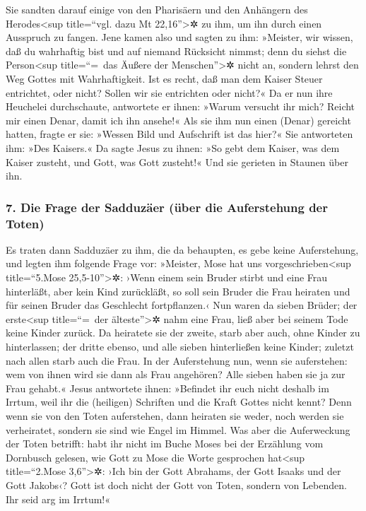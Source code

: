  Sie sandten darauf einige von den Pharisäern und den
Anhängern des Herodes\textless sup title=``vgl. dazu Mt
22,16''\textgreater✲ zu ihm, um ihn durch einen Ausspruch zu fangen.
 Jene kamen also und sagten zu ihm: »Meister, wir wissen,
daß du wahrhaftig bist und auf niemand Rücksicht nimmst; denn du siehst
die Person\textless sup title=``=~das Äußere der Menschen''\textgreater✲
nicht an, sondern lehrst den Weg Gottes mit Wahrhaftigkeit. Ist es
recht, daß man dem Kaiser Steuer entrichtet, oder nicht? Sollen wir sie
entrichten oder nicht?«  Da er nun ihre Heuchelei
durchschaute, antwortete er ihnen: »Warum versucht ihr mich? Reicht mir
einen Denar, damit ich ihn ansehe!«  Als sie ihm nun
einen (Denar) gereicht hatten, fragte er sie: »Wessen Bild und
Aufschrift ist das hier?« Sie antworteten ihm: »Des Kaisers.«
 Da sagte Jesus zu ihnen: »So gebt dem Kaiser, was dem
Kaiser zusteht, und Gott, was Gott zusteht!« Und sie gerieten in Staunen
über ihn.

\hypertarget{die-frage-der-sadduzuxe4er-uxfcber-die-auferstehung-der-toten}{%
\subsubsection{7. Die Frage der Sadduzäer (über die Auferstehung der
Toten)}\label{die-frage-der-sadduzuxe4er-uxfcber-die-auferstehung-der-toten}}

 Es traten dann Sadduzäer zu ihm, die da behaupten, es
gebe keine Auferstehung, und legten ihm folgende Frage vor:
 »Meister, Mose hat uns vorgeschrieben\textless sup
title=``5.Mose 25,5-10''\textgreater✲: ›Wenn einem sein Bruder stirbt
und eine Frau hinterläßt, aber kein Kind zurückläßt, so soll sein Bruder
die Frau heiraten und für seinen Bruder das Geschlecht fortpflanzen.‹
 Nun waren da sieben Brüder; der erste\textless sup
title=``=~der älteste''\textgreater✲ nahm eine Frau, ließ aber bei
seinem Tode keine Kinder zurück.  Da heiratete sie der
zweite, starb aber auch, ohne Kinder zu hinterlassen; der dritte ebenso,
 und alle sieben hinterließen keine Kinder; zuletzt nach
allen starb auch die Frau.  In der Auferstehung nun, wenn
sie auferstehen: wem von ihnen wird sie dann als Frau angehören? Alle
sieben haben sie ja zur Frau gehabt.«  Jesus antwortete
ihnen: »Befindet ihr euch nicht deshalb im Irrtum, weil ihr die
(heiligen) Schriften und die Kraft Gottes nicht kennt? 
Denn wenn sie von den Toten auferstehen, dann heiraten sie weder, noch
werden sie verheiratet, sondern sie sind wie Engel im Himmel.
 Was aber die Auferweckung der Toten betrifft: habt ihr
nicht im Buche Moses bei der Erzählung vom Dornbusch gelesen, wie Gott
zu Mose die Worte gesprochen hat\textless sup title=``2.Mose
3,6''\textgreater✲: ›Ich bin der Gott Abrahams, der Gott Isaaks und der
Gott Jakobs‹?  Gott ist doch nicht der Gott von Toten,
sondern von Lebenden. Ihr seid arg im Irrtum!«

